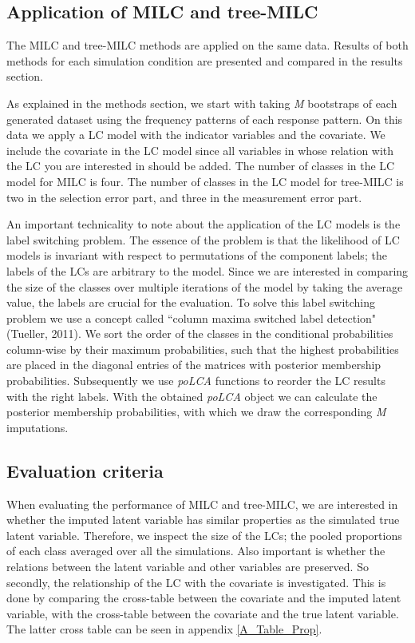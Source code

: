 \documentclass[a4paper, 11pt]{article} %
\begin{document}

\subsection{Application of MILC and tree-MILC}
The MILC and tree-MILC methods are applied on the same data. Results of both methods for each simulation condition are presented and compared in the results section. 

As explained in the methods section, we start with taking \textit{M} bootstraps of each generated dataset using the frequency patterns of each response pattern. On this data we apply a LC model with the indicator variables and the covariate. We include the covariate in the LC model since all variables in whose relation with the LC you are interested in should be added. The number of classes in the LC model for MILC is four. The number of classes in the LC model for tree-MILC is two in the selection error part, and three in the measurement error part. 

An important technicality to note about the application of the LC models is the label switching problem. The essence of the problem is that the likelihood of LC models is invariant with respect to permutations of the component labels; the labels of the LCs are arbitrary to the model. Since we are interested in comparing the size of the classes over multiple iterations of the model by taking the average value, the labels are crucial for the evaluation. To solve this label switching problem we use a concept called ``column maxima switched label detection" (Tueller, 2011). We sort the order of the classes in the conditional probabilities column-wise by their maximum probabilities, such that the highest probabilities are placed in the diagonal entries of the matrices with posterior membership probabilities. Subsequently we use \textit{poLCA} functions to reorder the LC results with the right labels. With the obtained \textit{poLCA} object we can calculate the posterior membership probabilities, with which we draw the corresponding \textit{M} imputations. 

\subsection{Evaluation criteria}
When evaluating the performance of MILC and tree-MILC, we are interested in whether the imputed latent variable has similar properties as the simulated true latent variable. Therefore, we inspect the size of the LCs; the pooled proportions of each class averaged over all the simulations. Also important is whether the relations between the latent variable and other variables are preserved. So secondly, the relationship of the LC with the covariate is investigated. This is done by comparing the cross-table between the covariate and the imputed latent variable, with the cross-table between the covariate and the true latent variable. The latter cross table can be seen in appendix \ref{A_Table_Prop}.
\end{document}
